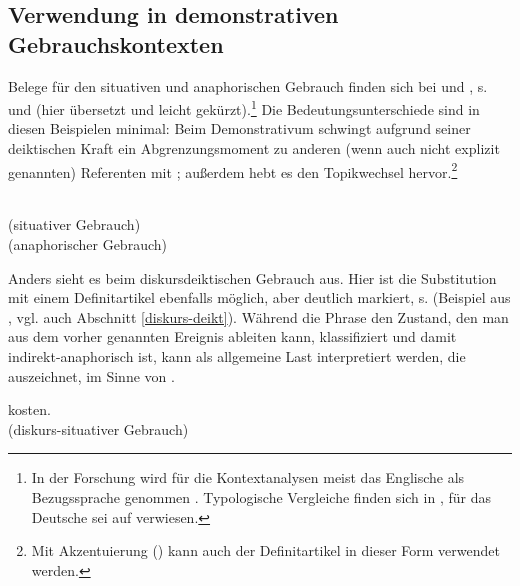\subsection{Verwendung in demonstrativen Gebrauchskontexten}\label{sec:definitartikel-in-demonstrativ}

Belege für den situativen und anaphorischen Gebrauch finden sich bei \textcite[110-111]{Hawkins1978} und \textcite[36]{Himmelmann1997}, s.  und  (hier übersetzt und leicht gekürzt).\footnote{In der Forschung wird für die Kontextanalysen meist das Englische als Bezugssprache genommen \parencite{Christophersen1939, Lobner1985,Lyons1999}. Typologische Vergleiche finden sich in \textcite{Himmelmann1997}, für das Deutsche sei auf \textcite{Bisle-Muller1991} verwiesen.} Die Bedeutungsunterschiede sind in diesen Beispielen minimal: Beim Demonstrativum schwingt aufgrund seiner deiktischen Kraft ein Abgrenzungsmoment zu anderen (wenn auch nicht explizit genannten) Referenten mit \parencite{Bisle-Muller1991}; außerdem hebt es den Topikwechsel hervor.\footnote{Mit Akzentuierung () kann auch der Definitartikel in dieser Form verwendet werden.}   

\begin{exe}
	\ex \label{ex:sitdef}   \\(situativer Gebrauch)
	\ex \label{ex:anadef}  \\(anaphorischer Gebrauch)
\end{exe}

Anders sieht es beim diskursdeiktischen Gebrauch aus. Hier ist die Substitution mit einem Definitartikel ebenfalls möglich, aber deutlich markiert, s.  (Beispiel aus \cite[95]{Marx2011}, vgl. auch Abschnitt \ref{diskurs-deikt}). Während die Phrase  den Zustand, den man aus dem vorher genannten Ereignis ableiten kann, klassifiziert und damit indirekt-anaphorisch ist, kann  als allgemeine Last interpretiert werden, die  auszeichnet, im Sinne von .

\begin{exe}
	\ex \label{ex:diskurs-deikt-def}   kosten. \\(diskurs-situativer Gebrauch)
	 \end{exe}


